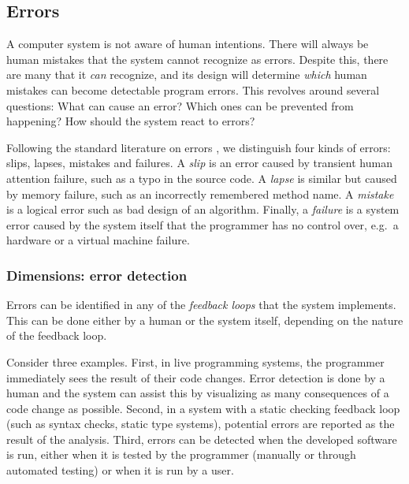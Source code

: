 \documentclass[english,submission]{programming}
\providecommand{\DIFaddbegin}{} %
\providecommand{\DIFaddend}{} %
\providecommand{\DIFdelbegin}{} %
\providecommand{\DIFdelend}{} %
\begin{document}
\hypertarget{errors}{%
\subsection{Errors}\label{errors}}

\DIFdelbegin %
\DIFdelend \DIFaddbegin {}
\DIFaddend 

A computer system is not aware of human intentions. There will always be
human mistakes that the system cannot recognize as errors. Despite this,
there are many that it \emph{can} recognize, and its design will
determine \emph{which} human mistakes can become detectable program
errors. This revolves around several questions: What can cause an error?
Which ones can be prevented from happening? How should the system react
to errors?

Following the standard literature on errors \cite{HumanError}, we
distinguish four kinds of errors: slips, lapses, mistakes and failures.
A \emph{slip} is an error caused by transient human attention failure,
such as a typo in the source code. A \emph{lapse} is similar but caused
by memory failure, such as an incorrectly remembered method name. A
\emph{mistake} is a logical error such as bad design of an algorithm.
Finally, a \emph{failure} is a system error caused by the system itself
that the programmer has no control over, e.g.~a hardware or a virtual
machine failure.

\hypertarget{dimensions-error-detection}{%
\subsubsection{Dimensions: error
detection}\label{dimensions-error-detection}}

Errors can be identified in any of the \emph{feedback loops} that the
system implements. This can be done either by a human or the system
itself, depending on the nature of the feedback loop.

Consider three examples. First, in live programming systems, the
programmer immediately sees the result of their code changes. Error
detection is done by a human and the system can assist this by
visualizing as many consequences of a code change as possible. Second,
in a system with a static checking feedback loop (such as syntax checks,
static type systems), potential errors are reported as the result of the
analysis. Third, errors can be detected when the developed software is
run, either when it is tested by the programmer (manually or through
automated testing) or when it is run by a user.
\end{document}
